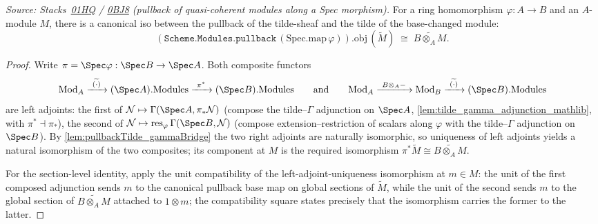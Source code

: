 \begin{lemma}
  \label{lem:pullback_tildeIso}
  \leanok
  \textit{Source: Stacks~\href{https://stacks.math.columbia.edu/tag/01HQ}{01HQ}
  / \href{https://stacks.math.columbia.edu/tag/0BJ8}{0BJ8} (pullback of
  quasi-coherent modules along a Spec morphism).}
  For a ring homomorphism \(\varphi : A \to B\) and an \(A\)-module
  \(M\), there is a canonical iso between the pullback of the
  tilde-sheaf and the tilde of the base-changed module:
  \[
    (\mathtt{Scheme.Modules.pullback}\, (\mathrm{Spec.map}\, \varphi)).\mathrm{obj}\,
      (\widetilde{M})
    \;\cong\;
    \widetilde{B \otimes_A M}.
  \]
\end{lemma}
\begin{proof}
  \leanok
  Write \(\pi = \Spec\varphi : \Spec B \to \Spec A\). Both composite
  functors
  \[
    \mathrm{Mod}_{A} \xrightarrow{\ \widetilde{(\cdot)}\ }
      (\Spec A).\mathrm{Modules} \xrightarrow{\ \pi^{*}\ }
      (\Spec B).\mathrm{Modules}
    \qquad\text{and}\qquad
    \mathrm{Mod}_{A} \xrightarrow{\ B \otimes_A -\ } \mathrm{Mod}_{B}
      \xrightarrow{\ \widetilde{(\cdot)}\ } (\Spec B).\mathrm{Modules}
  \]
  are left adjoints: the first of
  \(\mathcal N \mapsto \Gamma(\Spec A, \pi_{*}\mathcal N)\) (compose the
  tilde--\(\Gamma\) adjunction on \(\Spec A\),
  \cref{lem:tilde_gamma_adjunction_mathlib}, with
  \(\pi^{*} \dashv \pi_{*}\)), the second of
  \(\mathcal N \mapsto \mathrm{res}_{\varphi}\,\Gamma(\Spec B, \mathcal N)\)
  (compose extension--restriction of scalars along \(\varphi\) with the
  tilde--\(\Gamma\) adjunction on \(\Spec B\)). By
  \cref{lem:pullbackTilde_gammaBridge} the two right adjoints are
  naturally isomorphic, so uniqueness of left adjoints yields a natural
  isomorphism of the two composites; its component at \(M\) is the
  required isomorphism
  \(\pi^{*}\widetilde M \cong \widetilde{B \otimes_A M}\).

  For the section-level identity, apply the unit compatibility of the
  left-adjoint-uniqueness isomorphism at \(m \in M\): the unit of the
  first composed adjunction sends \(m\) to the canonical pullback base map
  on global sections of \(\widetilde M\), while the unit
  of the second sends \(m\) to the global section of
  \(\widetilde{B \otimes_A M}\) attached to \(1 \otimes m\); the
  compatibility square states precisely that the isomorphism carries
  the former to the latter.
\end{proof}

